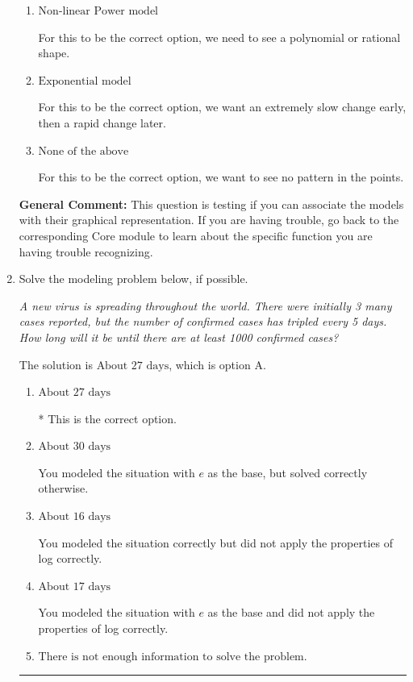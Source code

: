 \documentclass{extbook}[14pt]
\newcommand{\litem}[1]{\item #1

\rule{\textwidth}{0.4pt}}
\begin{document}
\begin{enumerate}
{\begin{enumerate}[label=\Alph*.]
For this to be the correct option, we need to see a mostly straight line of points.
\item \( \text{Non-linear Power model} \)

For this to be the correct option, we need to see a polynomial or rational shape.
\item \( \text{Exponential model} \)

For this to be the correct option, we want an extremely slow change early, then a rapid change later.
\item \( \text{None of the above} \)

For this to be the correct option, we want to see no pattern in the points.
\end{enumerate}

\textbf{General Comment:} This question is testing if you can associate the models with their graphical representation. If you are having trouble, go back to the corresponding Core module to learn about the specific function you are having trouble recognizing.
}
\litem{
Solve the modeling problem below, if possible.

\begin{center}
    \textit{ A new virus is spreading throughout the world. There were initially 3 many cases reported, but the number of confirmed cases has tripled every 5 days. How long will it be until there are at least 1000 confirmed cases? }
\end{center}


The solution is \( \text{About } 27 \text{ days} \), which is option A.\begin{enumerate}[label=\Alph*.]
\item \( \text{About } 27 \text{ days} \)

* This is the correct option.
\item \( \text{About } 30 \text{ days} \)

You modeled the situation with $e$ as the base, but solved correctly otherwise.
\item \( \text{About } 16 \text{ days} \)

You modeled the situation correctly but did not apply the properties of log correctly.
\item \( \text{About } 17 \text{ days} \)

You modeled the situation with $e$ as the base and did not apply the properties of log correctly.
\item \( \text{There is not enough information to solve the problem.} \)


\end{enumerate}}
\end{enumerate}
\end{document}
